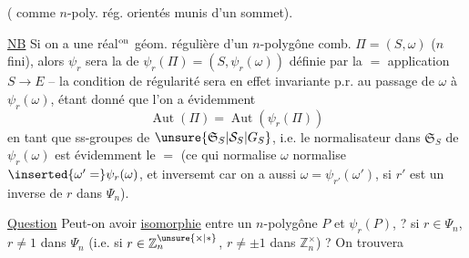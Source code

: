 ( comme $n$-poly. rég. orientés munis d'un sommet).  

\uline{NB} Si on a une  réal$^{\rm on}$ géom. régulière d'un $n$-polygône comb. $\Pi=(S,\omega)$ ($n$ fini), alors $\psi_r$ sera la  de $\psi_r(\Pi)=(S,\psi_r(\omega))$ définie par la $=$ application $S\longrightarrow E$ -- la condition de régularité sera en effet invariante p.r. au passage de $\omega$ à $\psi_r(\omega)$,  étant donné que  l'on a évidemment
\[
\operatorname{Aut}(\Pi)=\operatorname{Aut}(\psi_r(\Pi))\tag*{(27)}
\]
en tant que ss-groupes de $\unsure{\mathfrak S_S|\mathcal S_S|G_S}$, i.e. le normalisateur dans $\mathfrak S_S$ de   $\psi_r(\omega)$ est évidemment le $=$ (ce qui normalise $\omega$ normalise $\inserted{\omega'=}\psi_r(\omega)$, et inversemt car on a aussi $\omega=\psi_{r'}(\omega')$, si $r'$ est un inverse de $r$ dans $\Psi_n$).

\uline{Question} Peut-on avoir \uline{isomorphie} entre un $n$-polygône  $P$ et $\psi_r(P)$, ? si $r\in\Psi_n$, $r\neq1$ dans $\Psi_n$ (i.e. si $r\in\mathbb Z_n^{\unsure{\times|*}}$, $r\neq\pm1$ dans $\mathbb Z_n^\times$) ? On trouvera
